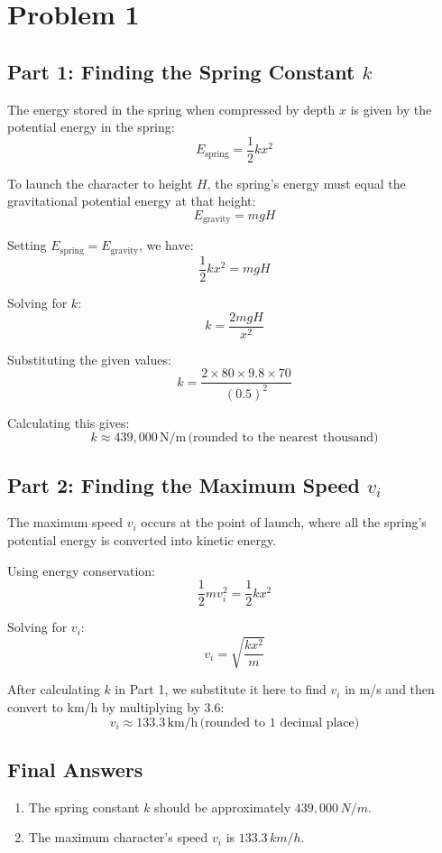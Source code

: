 \section{Problem 1}

\subsection*{Part 1: Finding the Spring Constant \( k \)}

The energy stored in the spring when compressed by depth \( x \) is given by the potential energy in the spring:
\[
E_{\text{spring}} = \frac{1}{2} k x^2
\]

To launch the character to height \( H \), the spring's energy must equal the gravitational potential energy at that height:
\[
E_{\text{gravity}} = m g H
\]

Setting \( E_{\text{spring}} = E_{\text{gravity}} \), we have:
\[
\frac{1}{2} k x^2 = m g H
\]

Solving for \( k \):
\[
k = \frac{2 m g H}{x^2}
\]

Substituting the given values:
\[
k = \frac{2 \times 80 \times 9.8 \times 70}{(0.5)^2}
\]

Calculating this gives:
\[
k \approx 439{,}000 \, \text{N/m} \, \text{(rounded to the nearest thousand)}
\]

\subsection*{Part 2: Finding the Maximum Speed \( v_i \)}

The maximum speed \( v_i \) occurs at the point of launch, where all the spring's potential energy is converted into kinetic energy.

Using energy conservation:
\[
\frac{1}{2} m v_i^2 = \frac{1}{2} k x^2
\]

Solving for \( v_i \):
\[
v_i = \sqrt{\frac{k x^2}{m}}
\]

After calculating \( k \) in Part 1, we substitute it here to find \( v_i \) in m/s and then convert to km/h by multiplying by 3.6:
\[
v_i \approx 133.3 \, \text{km/h} \, \text{(rounded to 1 decimal place)}
\]

\subsection*{Final Answers}
\begin{enumerate}
    \item The spring constant \( k \) should be approximately \( \boxed{439{,}000 \, N/m} \).
    \item The maximum character's speed \( v_i \) is \( \boxed{133.3 \, km/h} \).
\end{enumerate}
